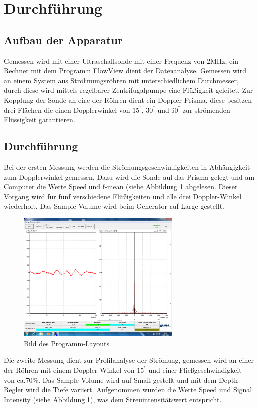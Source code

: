 \section{Durchführung}
\label{sec:Durchführung}
\subsection{Aufbau der Apparatur}
Gemessen wird mit einer Ultraschallsonde mit einer Frequenz von $2\si{\mega\hertz}$, ein
Rechner mit dem Programm FlowView dient der Datenanalyse. Gemessen wird an einem System aus Ströhmungsröhren mit unterschiedlichem
Durchmesser, durch diese wird mittels regelbarer Zentrifugalpumpe eine Flüßigkeit geleitet. Zur Kopplung der Sonde an eine der Röhren dient ein Doppler-Prisma, diese besitzen drei Flächen
die einen Dopplerwinkel von $15^°$, $30^°$ und $60^°$ zur strömenden Flüssigkeit garantieren.

\subsection{Durchführung}
Bei der ersten Messung werden die Strömungsgeschwindigkeiten in Abhängigkeit zum Dopplerwinkel gemessen. Dazu wird die Sonde auf das Prisma gelegt und am Computer die Werte Speed und
f-mean (siehe Abbildung \ref{fig:bsp} abgelesen.
Dieser Vorgang wird für fünf verschiedene Flüßigkeiten und alle drei Doppler-Winkel wiederholt. Das Sample Volume wird beim Generator auf Large gestellt.
\begin{figure}
  \includegraphics[width=0.7\textwidth]{Unbenannt.png}
  \centering
   \caption{Bild des Programm-Layouts }
  \label{fig:bsp}
\end{figure}

Die zweite Messung dient zur Profilanalyse der Strömung, gemessen wird an einer der Röhren mit einem Doppler-Winkel von $15^°$ und einer
Fließgeschwindigkeit von ca.$70\%$.
Das Sample Volume wird auf Small gestellt und mit dem Depth-Regler wird die Tiefe variiert.
Aufgenommen wurden die Werte Speed und Signal Intensity (siehe Abbildung \ref{fig:bsp}), was dem Streuintensitätswert entspricht.
